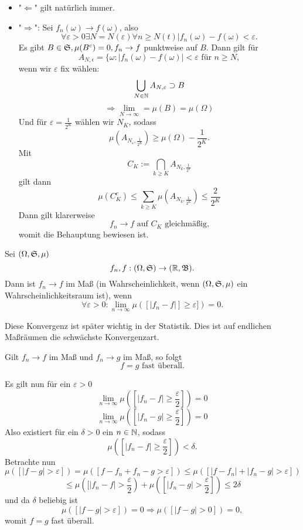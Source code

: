			\begin{bew}$ $
				\begin{itemize}
					\item "$\Leftarrow$" gilt natürlich immer.
					\item "$\Rightarrow$":\newline
					Sei $f_n(\omega)\to f(\omega)$, also
					\[ \forall \varepsilon>0\exists N=N(\varepsilon)\forall n\ge N(t) |f_n(\omega)-f(\omega)<\varepsilon. \]
					Es gibt $B\in\mathfrak{S}, \mu(B^c)=0, f_n\to f$ punktweise auf $B$. Dann gilt für
					\[ A_{N,\epsilon}=\{\omega:|f_n(\omega)-f(\omega)|<\varepsilon \text{ für }n\ge N, \]
					wenn wir $\varepsilon$ fix wählen:
					\[ \bigcup_{N\in\mathbb{N}}A_{N,\varepsilon}\supset B \]
					\[ \Rightarrow \lim_{N\to\infty}=\mu(B)=\mu(\Omega) \]
					Und für $\varepsilon=\frac{1}{2^K}$ wählen wir $N_K$, sodass
					\[ \mu(A_{N_\varepsilon,\frac{1}{2^K}})\ge\mu(\Omega)-\frac{1}{2^K}. \]
					Mit 
					\[ C_K:=\bigcap_{k\ge K} A_{N_k,\frac{1}{2^k}} \]
					gilt dann
					\[ \mu(C_K^c)\le\sum_{k\ge K}\mu(A_{N_k,\frac{1}{2^K}})\le \frac{2}{2^K} \]
					Dann gilt klarerweise
					\[ f_n\to f\text{ auf }C_K\text{ gleichmäßig,} \]
					womit die Behauptung bewiesen ist. 
				\end{itemize}
			\end{bew}
			
			\begin{defi}
				Sei $(\Omega,\mathfrak{S},\mu)$
				\[ f_n,f: (\Omega,\mathfrak{S})\to(\mathbb{R},\mathfrak{B}). \]
				Dann ist $f_n\to f$ im Maß (in Wahrscheinlichkeit, wenn $(\Omega, \mathfrak{S},\mu)$ ein Wahrscheinlichkeitsraum ist), wenn
				\[ \forall \varepsilon>0: \lim_{n\to\infty}\mu([|f_n-f|]\ge\varepsilon])=0. \]
			\end{defi}
			
			\begin{bem}
				Diese Konvergenz ist später wichtig in der Statistik. Dies ist auf endlichen Maßräumen die schwächste Konvergenzart. 
			\end{bem}
			
			\begin{satz}
				Gilt $f_n\to f$ im Maß und $f_n\to g$ im Maß, so folgt
				\[ f=g \text{ fast überall}. \]
			\end{satz}
			
			\begin{bew}
				Es gilt nun für ein $\varepsilon>0$
				\[ \lim_{n\to\infty} \mu([|f_n-f|\ge \frac{\varepsilon}{2}])=0 \]
				\[ \lim_{n\to\infty} \mu([|f_n-g|\ge \frac{\varepsilon}{2}])=0 \]
				Also existiert für ein $\delta>0$ ein $n\in\mathbb{N}$, sodass
				\[ \mu([|f_n-f|\ge\frac{\varepsilon}{2}])<\delta. \]
				Betrachte nun
				\[ \mu([|f-g|>\varepsilon])=\mu([f-f_n+f_n-g>\varepsilon])\le\mu([|f-f_n|+|f_n-g|>\varepsilon]) \]
				\[ \le \mu([|f_n-f|>\frac{\varepsilon}{2})+\mu([|f_n-g|>\frac{\varepsilon}{2}])\le 2\delta \]
				und da $\delta$ beliebig ist
				\[ \mu([|f-g|>\varepsilon])=0\Rightarrow\mu([|f-g|>0])=0, \]
				womit $f=g$ fast überall. 
			\end{bew}
			
